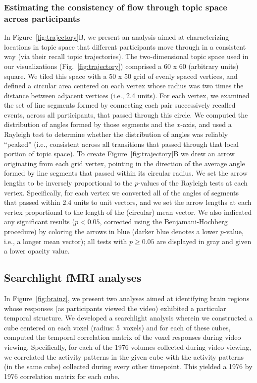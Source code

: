 \documentclass{article}
\begin{document}
\subsubsection*{Estimating the consistency of flow through topic space across participants}
In Figure~\ref{fig:trajectory}B, we present an analysis aimed at characterizing locations in topic space that different participants move through in a consistent way (via their recall topic trajectories).  The two-dimensional topic space used in our visualizations (Fig.~\ref{fig:trajectory}) comprised a 60 x 60 (arbitrary units) square.  We tiled this space with a 50 x 50 grid of evenly spaced vertices, and defined a circular area centered on each vertex whose radius was two times the distance between adjacent vertices (i.e., 2.4 units).  For each vertex, we examined the set of line segments formed by connecting each pair successively recalled events, across all participants, that passed through this circle.  We computed the distribution of angles formed by those segments and the $x$-axis, and used a Rayleigh test to determine whether the distribution of angles was reliably ``peaked'' (i.e., consistent across all transitions that passed through that local portion of topic space).  To create Figure~\ref{fig:trajectory}B we drew an arrow originating from each grid vertex, pointing in the direction of the average angle formed by line segments that passed within its circular radius.  We set the arrow lengths to be inversely proportional to the $p$-values of the Rayleigh tests at each vertex.  Specifically, for each vertex we converted all of the angles of segments that passed within 2.4 units to unit vectors, and we set the arrow lengths at each vertex proportional to the length of the (circular) mean vector.  We also indicated any significant results ($p < 0.05$, corrected using the Benjamani-Hochberg procedure) by coloring the arrows in blue (darker blue denotes a lower $p$-value, i.e., a longer mean vector); all tests with $p \geq 0.05$ are displayed in gray and given a lower opacity value.

\subsection*{Searchlight fMRI analyses}
In Figure~\ref{fig:brainz}, we present two analyses aimed at identifying brain regions whose responses (as participants viewed the video) exhibited a particular temporal structure.  We developed a searchlight analysis wherein we constructed a cube centered on each voxel (radius: 5~voxels) and for each of these cubes, computed the temporal correlation matrix of the voxel responses during video viewing.  Specifically, for each of the 1976 volumes collected during video viewing, we correlated the activity patterns in the given cube with the activity patterns (in the same cube) collected during every other timepoint.  This yielded a 1976 by 1976 correlation matrix for each cube.
\end{document}

